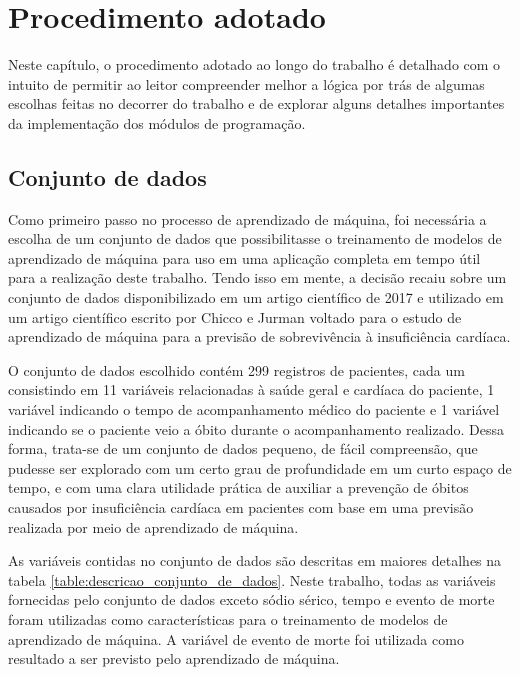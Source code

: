 \chapter{Procedimento adotado} \label{chap:procedimento_adotado}

Neste capítulo, o procedimento adotado ao longo do trabalho é detalhado com o intuito de permitir ao leitor compreender melhor a lógica por trás de algumas escolhas feitas no decorrer do trabalho e de explorar alguns detalhes importantes da implementação dos módulos de programação.

\section{Conjunto de dados}

Como primeiro passo no processo de aprendizado de máquina, foi necessária a escolha de um conjunto de dados que possibilitasse o treinamento de modelos de aprendizado de máquina para uso em uma aplicação completa em tempo útil para a realização deste trabalho. Tendo isso em mente, a decisão recaiu sobre um conjunto de dados \cite{larxel_dataset} disponibilizado em um artigo científico de 2017 \cite{dataset_article} e utilizado em um artigo científico escrito por Chicco e Jurman \cite{chicco2020} voltado para o estudo de aprendizado de máquina para a previsão de sobrevivência à insuficiência cardíaca.

O conjunto de dados escolhido contém 299 registros de pacientes, cada um consistindo em 11 variáveis relacionadas à saúde geral e cardíaca do paciente, 1 variável indicando o tempo de acompanhamento médico do paciente e 1 variável indicando se o paciente veio a óbito durante o acompanhamento realizado. Dessa forma, trata-se de um conjunto de dados pequeno, de fácil compreensão, que pudesse ser explorado com um certo grau de profundidade em um curto espaço de tempo, e com uma clara utilidade prática de auxiliar a prevenção de óbitos causados por insuficiência cardíaca em pacientes com base em uma previsão realizada por meio de aprendizado de máquina.

As variáveis contidas no conjunto de dados são descritas em maiores detalhes na tabela \ref{table:descricao_conjunto_de_dados}. Neste trabalho, todas as variáveis fornecidas pelo conjunto de dados exceto sódio sérico, tempo e evento de morte foram utilizadas como características para o treinamento de modelos de aprendizado de máquina. A variável de evento de morte foi utilizada como resultado a ser previsto pelo aprendizado de máquina.

